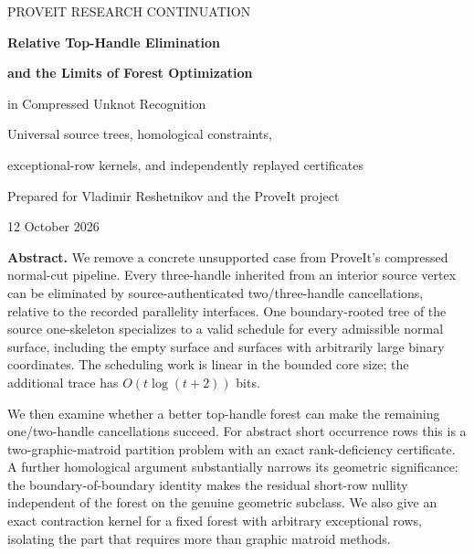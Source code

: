 \documentclass[11pt,letterpaper]{article}
\theoremstyle{definition}
\theoremstyle{remark}
\begin{document}
\hypersetup{pageanchor=false}
\begin{titlepage}
\vspace*{0.10in}
{\large\color{Accent}\sffamily PROVEIT RESEARCH CONTINUATION\par}
\vspace{0.20in}
{\fontsize{27}{31}\selectfont\bfseries\color{Ink}Relative Top-Handle Elimination\par}
\vspace{0.08in}
{\fontsize{21}{25}\selectfont\bfseries\color{Ink}and the Limits of Forest Optimization\par}
\vspace{0.10in}
{\Large in Compressed Unknot Recognition\par}
\vspace{0.22in}
{\normalsize Universal source trees, homological constraints,\par
exceptional-row kernels, and independently replayed certificates\par}
\vspace{0.24in}
Prepared for Vladimir Reshetnikov and the ProveIt project\par
12 October 2026\par
\vspace{0.20in}
\noindent\begin{minipage}{\textwidth}
\small
\textbf{Abstract.}
We remove a concrete unsupported case from ProveIt's compressed normal-cut
pipeline. Every three-handle inherited from an interior source vertex can be
eliminated by source-authenticated two/three-handle cancellations, relative to
the recorded parallelity interfaces. One boundary-rooted tree of the source
one-skeleton specializes to a valid schedule for every admissible normal
surface, including the empty surface and surfaces with arbitrarily large
binary coordinates. The scheduling work is linear in the bounded core size;
the additional trace has $O(t\log(t+2))$ bits.

We then examine whether a better top-handle forest can make the remaining
one/two-handle cancellations succeed. For abstract short occurrence rows this
is a two-graphic-matroid partition problem with an exact rank-deficiency
certificate. A further homological argument substantially narrows its
geometric significance: the boundary-of-boundary identity makes the residual
short-row nullity independent of the forest on the genuine geometric
subclass. We also give an exact contraction kernel for a fixed forest with
arbitrary exceptional rows, isolating the part that requires more than graphic
matroid methods.


\end{minipage}
\end{titlepage}
\end{document}
